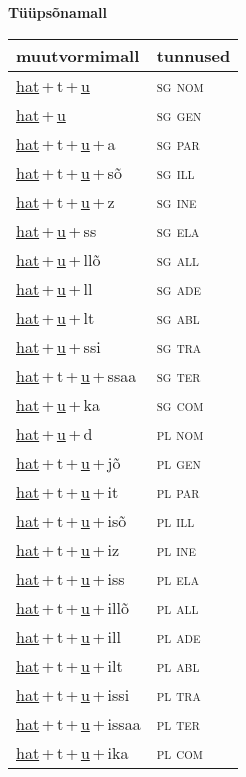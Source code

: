 
\vspace{1.8em}
\begin{minipage}{\textwidth}
\textbf{Tüüpsõnamall \,}\\

\begin{sideways}
\begin{tabular}{l l}
muutvormimall & tunnused \\
\hline
\underline{hat}\,+\,t\,+\,\underline{u} & \textsc{ sg nom } \\
\underline{hat}\,+\,\underline{u} & \textsc{ sg gen } \\
\underline{hat}\,+\,t\,+\,\underline{u}\,+\,a & \textsc{ sg par } \\
\underline{hat}\,+\,t\,+\,\underline{u}\,+\,sõ & \textsc{ sg ill } \\
\underline{hat}\,+\,t\,+\,\underline{u}\,+\,z & \textsc{ sg ine } \\
\underline{hat}\,+\,\underline{u}\,+\,ss & \textsc{ sg ela } \\
\underline{hat}\,+\,\underline{u}\,+\,llõ & \textsc{ sg all } \\
\underline{hat}\,+\,\underline{u}\,+\,ll & \textsc{ sg ade } \\
\underline{hat}\,+\,\underline{u}\,+\,lt & \textsc{ sg abl } \\
\underline{hat}\,+\,\underline{u}\,+\,ssi & \textsc{ sg tra } \\
\underline{hat}\,+\,t\,+\,\underline{u}\,+\,ssaa & \textsc{ sg ter } \\
\underline{hat}\,+\,\underline{u}\,+\,ka & \textsc{ sg com } \\
\underline{hat}\,+\,\underline{u}\,+\,d & \textsc{ pl nom } \\
\underline{hat}\,+\,t\,+\,\underline{u}\,+\,jõ & \textsc{ pl gen } \\
\underline{hat}\,+\,t\,+\,\underline{u}\,+\,it & \textsc{ pl par } \\
\underline{hat}\,+\,t\,+\,\underline{u}\,+\,isõ & \textsc{ pl ill } \\
\underline{hat}\,+\,t\,+\,\underline{u}\,+\,iz & \textsc{ pl ine } \\
\underline{hat}\,+\,t\,+\,\underline{u}\,+\,iss & \textsc{ pl ela } \\
\underline{hat}\,+\,t\,+\,\underline{u}\,+\,illõ & \textsc{ pl all } \\
\underline{hat}\,+\,t\,+\,\underline{u}\,+\,ill & \textsc{ pl ade } \\
\underline{hat}\,+\,t\,+\,\underline{u}\,+\,ilt & \textsc{ pl abl } \\
\underline{hat}\,+\,t\,+\,\underline{u}\,+\,issi & \textsc{ pl tra } \\
\underline{hat}\,+\,t\,+\,\underline{u}\,+\,issaa & \textsc{ pl ter } \\
\underline{hat}\,+\,t\,+\,\underline{u}\,+\,ika & \textsc{ pl com } \\
\end{tabular}
\end{sideways}
\label{tab:tüüpsõnamall-hattu}


\end{minipage}
